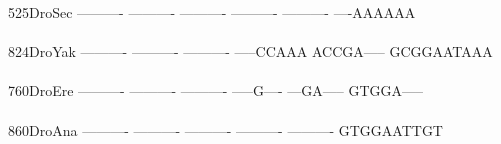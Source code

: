 \documentclass[11pt,twoside,reqno,a4paper]{article}
\begin{document}
{525\hspace*{2\charwidth}DroSec	----------	----------	----------	----------	----------	----AAAAAA	\\
\hspace*{5\charwidth}\hspace*{7\charwidth}\hspace*{1\charwidth}\hspace*{1\charwidth}\hspace*{1\charwidth}\hspace*{1\charwidth}\hspace*{1\charwidth}\hspace*{1\charwidth}\\
824\hspace*{2\charwidth}DroYak	----------	----------	----------	-----CCAAA	ACCGA-----	GCGGAATAAA	\\
\hspace*{5\charwidth}\hspace*{7\charwidth}\hspace*{1\charwidth}\hspace*{1\charwidth}\hspace*{1\charwidth}\hspace*{1\charwidth}\hspace*{1\charwidth}\hspace*{1\charwidth}\\
760\hspace*{2\charwidth}DroEre	----------	----------	----------	-----G----	---GA-----	GTGGA-----	\\
\hspace*{5\charwidth}\hspace*{7\charwidth}\hspace*{1\charwidth}\hspace*{1\charwidth}\hspace*{1\charwidth}\hspace*{1\charwidth}\hspace*{1\charwidth}\hspace*{1\charwidth}\\
860\hspace*{2\charwidth}DroAna	----------	----------	----------	----------	----------	GTGGAATTGT	\\
\hspace*{5\charwidth}\hspace*{7\charwidth}\hspace*{1\charwidth}\hspace*{1\charwidth}\hspace*{1\charwidth}\hspace*{1\charwidth}\hspace*{1\charwidth}\hspace*{1\charwidth}\\
}
\end{document}
